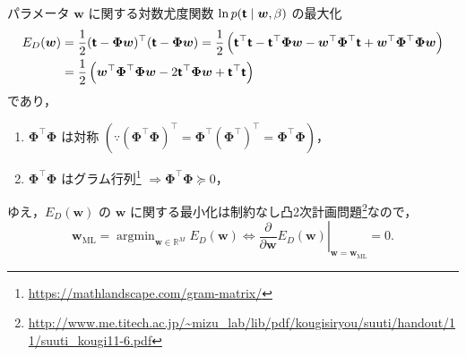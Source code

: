 \documentclass[uplatex,11pt,dvipdfmx,aspectratio=169,unicode,t]{beamer}
\numberwithin{equation}{section}
\newcommand{\BR}{\mathbb{R}}
\newcommand{\tb}[1]{\textbf{#1}}
\newcommand{\ts}[1]{\textsf{#1}}
\newcommand{\bs}[1]{\boldsymbol{#1}}
\newcommand{\1}{\bs{1}}
\newcommand{\0}{\bs{0}}
\DeclareMathOperator*{\argmin}{argmin}
\begin{document}
\begin{frame}{パラメータ $\bs{w}$ に関する対数尤度関数 $\ln p(\tb{\ts{t}} \mid \bs{w},\beta)$ の最大化}
    \vspace{-22pt}
    \begin{align}
        E_{D}(\bs{w}) &= \frac{1}{2} (\tb{\ts{t}} - \bs{\Phi}\bs{w})^{\top} (\tb{\ts{t}} - \bs{\Phi}\bs{w}) = \frac{1}{2} \left(\tb{\ts{t}}^{\top} \tb{\ts{t}} - \tb{\ts{t}}^{\top} \bs{\Phi} \bs{w} - \bs{w}^{\top} \bs{\Phi}^{\top} \tb{\ts{t}} + \bs{w}^{\top} \bs{\Phi}^{\top} \bs{\Phi} \bs{w}\right) \\
        &= \frac{1}{2} \left(\bs{w}^{\top} \bs{\Phi}^{\top} \bs{\Phi} \bs{w} - 2 \tb{\ts{t}}^{\top} \bs{\Phi} \bs{w} + \tb{\ts{t}}^{\top} \tb{\ts{t}}\right)
    \end{align}
    であり，
    \begin{enumerate}[(1)]
        \item $\bs{\Phi}^{\top} \bs{\Phi}$ は対称 $\left(\because \left(\bs{\Phi}^{\top} \bs{\Phi}\right)^{\top} = \bs{\Phi}^{\top} \left(\bs{\Phi}^{\top}\right)^{\top} = \bs{\Phi}^{\top} \bs{\Phi}\right)$，
        \item $\bs{\Phi}^{\top} \bs{\Phi}$ はグラム行列\footnote{\url{https://mathlandscape.com/gram-matrix/}} $\Longrightarrow \bs{\Phi}^{\top} \bs{\Phi} \succeq 0$，
    \end{enumerate}
    ゆえ，$E_{D}(\bs{w})$ の $\bs{w}$ に関する最小化は制約なし凸2次計画問題\footnote{\url{http://www.me.titech.ac.jp/~mizu_lab/lib/pdf/kougisiryou/suuti/handout/11/suuti_kougi11-6.pdf}}なので，
    \begin{equation}
        \bs{w}_{\text{ML}} = \argmin_{\bs{w} \in \BR^{M}} E_{D}(\bs{w}) \iff \left.\frac{\partial}{\partial{\bs{w}}} E_{D}(\bs{w})\right|_{\bs{w} = \bs{w}_{\text{ML}}} = 0.
    \end{equation}
\end{frame}
\end{document}
